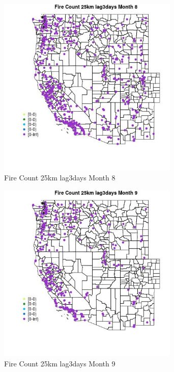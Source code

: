 \begin{figure} 
\centering  
\includegraphics[width=0.77\textwidth]{Code_Outputs/Report_ML_input_PM25_Step4_part_e_de_duplicated_aves_compiled_2019-05-18wNAs_MapObsMo8Fire_Count_25km_lag3days.jpg} 
\caption{\label{fig:Report_ML_input_PM25_Step4_part_e_de_duplicated_aves_compiled_2019-05-18wNAsMapObsMo8Fire_Count_25km_lag3days}Fire Count 25km lag3days Month 8} 
\end{figure} 
 

\begin{figure} 
\centering  
\includegraphics[width=0.77\textwidth]{Code_Outputs/Report_ML_input_PM25_Step4_part_e_de_duplicated_aves_compiled_2019-05-18wNAs_MapObsMo9Fire_Count_25km_lag3days.jpg} 
\caption{\label{fig:Report_ML_input_PM25_Step4_part_e_de_duplicated_aves_compiled_2019-05-18wNAsMapObsMo9Fire_Count_25km_lag3days}Fire Count 25km lag3days Month 9} 
\end{figure} 
 

